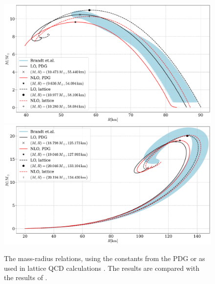 \begin{figure}[!htb]
    \centering
    \includegraphics[width=.85\textwidth]{../scripts/figurer/pion_star/lattice_const_compare.pdf}
    \includegraphics[width=.85\textwidth]{../scripts/figurer/pion_star/lattice_const_compare_neutrino.pdf}
    \caption{The mass-radius relations, using the constants from the PDG \autocite{particledatagroupReviewParticlePhysics2020} or as used in lattice QCD calculations \autocite{brandtNewClassCompact2018}.
    The results are compared with the results of \autocite{brandtNewClassCompact2018}.}
    \label{fig: different constants compare}
\end{figure}
